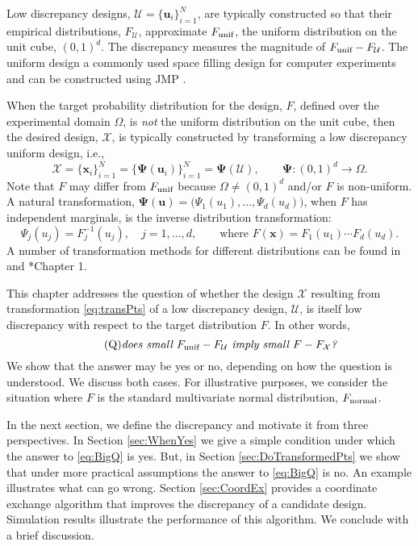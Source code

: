 \documentclass[graybox]{svmult}
\newcommand{\vx}{\boldsymbol{x}}
\newcommand{\vu}{\boldsymbol{u}}
\newcommand{\vPsi}{\boldsymbol{\Psi}}
\newcommand{\Udes}{\mathcal{U}}
\newcommand{\Xdes}{\mathcal{X}}
\newcommand{\Ftar}{F}
\newcommand{\cube}{\ensuremath{(0,1)^d}}
\newcommand{\unif}{\textup{unif}}
\newcommand{\normal}{\textup{normal}}
\begin{document}
Low discrepancy designs, $\Udes = \{\vu_i\}_{i=1}^N$, are typically constructed so that their empirical distributions, $F_\Udes$, approximate $F_\unif$, the uniform distribution on the unit cube, \cube.  
The discrepancy measures the magnitude of $F_\unif-F_\Udes$. 
The uniform design a commonly used space filling design for computer experiments \cite{FanLiSud06} and can be constructed using  JMP\textsuperscript{\textregistered} \cite{sall2012jmp}.

When the target probability distribution for the design, $\Ftar$, defined over the experimental domain $\Omega$, is \emph{not} the uniform distribution on the unit cube, then the desired design, $\Xdes$, is typically constructed by transforming a low discrepancy uniform design, i.e., 
\begin{equation} \label{eq:transPts}
\Xdes = \{\vx_i\}_{i=1}^N = \{\vPsi(\vu_i)\}_{i=1}^N = \vPsi(\Udes), \qquad \vPsi: \cube \to \Omega.
\end{equation}
Note that $\Ftar$ may differ from $F_\unif$ because $\Omega \ne \cube$ and/or $\Ftar$ is non-uniform.  
A natural transformation, $\vPsi(\vu)=\bigl(\Psi_1(u_1),\ldots,\Psi_d(u_d) \bigr)$, when $\Ftar$ has independent marginals, is the inverse distribution transformation:
\begin{equation}\label{eq:inverse}
\Psi_j(u_j) = F_j^{-1}(u_j), \quad j =1, \ldots, d, \qquad \text{where } \Ftar(\vx) = F_1(u_1) \cdots F_d(u_d).
\end{equation}
A number of transformation methods for different distributions can be found in \cite{DEVROYE200683} and \cite{FanWan94}*{Chapter 1}.

This chapter addresses the question of whether the design $\Xdes$ resulting from transformation \eqref{eq:transPts} of a low discrepancy design, $\Udes$, is itself low discrepancy with respect to the target distribution $\Ftar$. 
In other words, 
\begin{equation} \label{eq:BigQ} \tag{Q}
\text{\emph{does small $F_\unif - F_\Udes$ imply small $\Ftar - F_\Xdes$?}}
\end{equation}
We show that the answer may be yes or no, depending on how the question is understood.  
We discuss both cases.  
For illustrative purposes, we consider the situation where $\Ftar$ is the standard multivariate normal distribution, $F_\normal$.

In the next section, we define the discrepancy and motivate it from three perspectives.  In Section \ref{sec:WhenYes} we give a simple condition under which the answer to \eqref{eq:BigQ} is yes.  But, in Section \ref{sec:DoTransformedPts} we show that under more practical assumptions the answer to \eqref{eq:BigQ} is no.  An example illustrates what can go wrong.  Section \ref{sec:CoordEx} provides a coordinate exchange algorithm that improves the discrepancy of a candidate design.  Simulation results illustrate the performance of this algorithm.  We conclude with a brief discussion.
\end{document}
